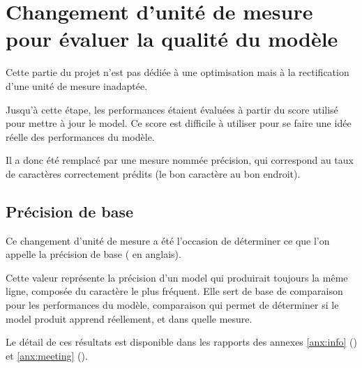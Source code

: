 \section{Changement d'unité de mesure pour évaluer la qualité du modèle}
Cette partie du projet n'est pas dédiée à une optimisation mais à la rectification d'une unité de mesure inadaptée.

Jusqu'à cette étape, les performances étaient évaluées à partir du score utilisé pour mettre à jour le \gls{model}. Ce score est difficile à utiliser pour se faire une idée réelle des performances du modèle. 

Il a donc été remplacé par une mesure nommée \og précision\fg{}, qui correspond au taux de caractères correctement prédits (le bon caractère au bon endroit).

\subsection{Précision de base}
Ce changement d'unité de mesure a été l'occasion de déterminer ce que l'on appelle la précision de base ( en anglais).

Cette valeur représente la précision d'un \gls{model} qui produirait toujours la même ligne, composée du caractère le plus fréquent. Elle sert de base de comparaison pour les performances du modèle, comparaison qui permet de déterminer si le \gls{model} produit apprend réellement, et dans quelle mesure.

Le détail de ces résultats est disponible dans les rapports des annexes \ref{anx:info} () et \ref{anx:meeting} ().
